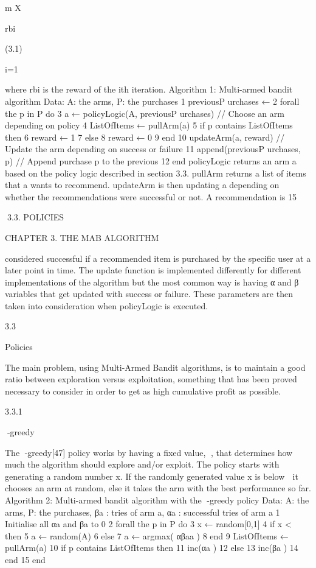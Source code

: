 m
X

rbi

(3.1)

i=1

where rbi is the reward of the ith iteration.
Algorithm 1: Multi-armed bandit algorithm
Data: A: the arms, P: the purchases
1 previousP urchases ← {}
2 forall the p in P do
3
a ← policyLogic(A, previousP urchases) // Choose an arm depending on
policy
4
ListOfItems ← pullArm(a)
5
if p contains ListOfItems then
6
reward ← 1
7
else
8
reward ← 0
9
end
10
updateArm(a, reward) // Update the arm depending on success or failure
11
append(previousP urchases, p) // Append purchase p to the previous
12 end
policyLogic returns an arm a based on the policy logic described in section 3.3. pullArm
returns a list of items that a wants to recommend. updateArm is then updating a depending on whether the recommendations were successful or not. A recommendation is
15

3.3. POLICIES

CHAPTER 3. THE MAB ALGORITHM

considered successful if a recommended item is purchased by the specific user at a later
point in time. The update function is implemented differently for different implementations of the algorithm but the most common way is having α and β variables that
get updated with success or failure. These parameters are then taken into consideration
when policyLogic is executed.

3.3

Policies

The main problem, using Multi-Armed Bandit algorithms, is to maintain a good ratio
between exploration versus exploitation, something that has been proved necessary to
consider in order to get as high cumulative profit as possible.

3.3.1

-greedy

The -greedy[47] policy works by having a fixed value, , that determines how much the
algorithm should explore and/or exploit. The policy starts with generating a random
number x. If the randomly generated value x is below  it chooses an arm at random,
else it takes the arm with the best performance so far.
Algorithm 2: Multi-armed bandit algorithm with the -greedy policy
Data: A: the arms, P: the purchases, βa : tries of arm a, αa : successful tries of
arm a
1 Initialise all αa and βa to 0
2 forall the p in P do
3
x ← random[0,1]
4
if x <  then
5
a ← random(A)
6
else
7
a ← argmax( αβaa )
8
end
9
ListOfItems ← pullArm(a)
10
if p contains ListOfItems then
11
inc(αa )
12
else
13
inc(βa )
14
end
15 end

